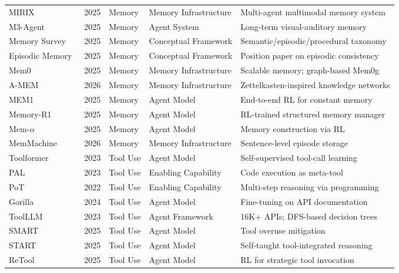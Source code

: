 \begin{table}[htbp]
{\begin{tabular}{@{} l l l l l @{}}
MIRIX~\cite{wang2025mirix} & 2025 & Memory & Memory Infrastructure & Multi-agent multimodal memory system \\
M3-Agent~\cite{long2025seeing} & 2025 & Memory & Agent System & Long-term visual-auditory memory \\
Memory Survey~\cite{zhang2025survey} & 2025 & Memory & Conceptual Framework & Semantic/episodic/procedural taxonomy \\
Episodic Memory~\cite{pink2025position} & 2025 & Memory & Conceptual Framework & Position paper on episodic consistency \\
Mem0~\cite{chhikara2025mem0} & 2025 & Memory & Memory Infrastructure & Scalable memory; graph-based Mem0g \\
A-MEM~\cite{xu2026mem} & 2026 & Memory & Memory Infrastructure & Zettelkasten-inspired knowledge networks \\
MEM1~\cite{zhou2025mem1} & 2025 & Memory & Agent Model & End-to-end RL for constant memory \\
Memory-R1~\cite{yan2025memory} & 2025 & Memory & Agent Model & RL-trained structured memory manager \\
Mem-$\alpha$~\cite{wang2025mem} & 2025 & Memory & Agent Model & Memory construction via RL \\
MemMachine~\cite{wang2026memmachine} & 2026 & Memory & Memory Infrastructure & Sentence-level episode storage \\
Toolformer~\cite{schick2023toolformer} & 2023 & Tool Use & Agent Model & Self-supervised tool-call learning \\
PAL~\cite{gao2023pal} & 2023 & Tool Use & Enabling Capability & Code execution as meta-tool \\
PoT~\cite{chen2022program} & 2022 & Tool Use & Enabling Capability & Multi-step reasoning via programming \\
Gorilla~\cite{patil2023gorilla} & 2024 & Tool Use & Agent Model & Fine-tuning on API documentation \\
ToolLLM~\cite{qin2023toolllm} & 2023 & Tool Use & Agent Framework & 16K+ APIs; DFS-based decision trees \\
SMART~\cite{qian2025smart} & 2025 & Tool Use & Agent Model & Tool overuse mitigation \\
START~\cite{li2025start} & 2025 & Tool Use & Agent Model & Self-taught tool-integrated reasoning \\
ReTool~\cite{feng2025retool} & 2025 & Tool Use & Agent Model & RL for strategic tool invocation \\

\end{tabular}}
\end{table}
